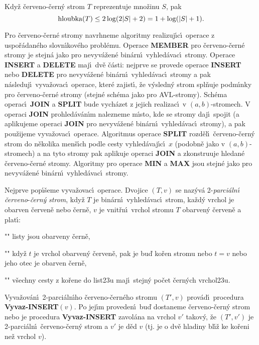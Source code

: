 Kdy\v z \v cerveno-\v cern\'y strom $T$ 
reprezentuje mno\v zinu $S$, pak $$\operatorname{hloubka}(T)\le 2\log(2|S|+2)=1+\log(|S|+1).$$
\endproclaim

\flushpar Pro \v cerveno-\v cern\'e stromy navrhneme algoritmy 
realizuj\'\i c\'\i\ ope\-race z uspo\v r\'adan\'eho slovn\'\i\-ko\-v\'eho probl\'emu.  
Operace {\bf MEMBER} pro \v cerveno-\v cern\'e stromy je stejn\'a jako pro 
nevyv\'a\v zen\'e bin\'arn\'\i\ vyhled\'avac\'\i\ stromy. Operace 
{\bf IN\-SERT} a {\bf DELETE} maj\'\i\ dv\v e \v c\'asti:  nejprve se provede 
ope\-race {\bf INSERT} nebo {\bf DELETE} pro nevyv\'a\v zen\'e bin\'arn\'\i\ 
vy\-hled\'avac\'\i\ stromy a pak n\'asleduj\'\i\ vyva\v zovac\'\i\ operace, kter\'e 
zajist\'\i , \v ze v\'ysledn\'y strom spl\v nuje pod\-m\'\i n\-ky pro \v cerveno-\v cern\'e 
stromy (stejn\'e sch\'ema jako pro AVL-stromy). Sch\'ema operac\'\i\ 
{\bf JOIN} a {\bf SPLIT} bude vych\'azet z jejich realizac\'\i\ v $
(a,b)$-stromech. 
V operaci {\bf JOIN} prohled\'av\'an\'\i m nalezneme m\'\i sto, kde se 
stromy  
daj\'\i\ spojit (a aplikujeme operaci {\bf JOIN} pro 
nevyv\'a\v zen\'e 
bin\'arn\'\i\ vyhled\'a\-va\-c\'\i\ stromy), a pak pou\v zijeme 
vyva\v zovac\'\i\ operace. Algoritmus ope\-race {\bf SPLIT} rozd\v el\'\i\ \v cerveno-\v cern\'y strom 
do n\v ekolika men\v s\'\i ch podle cesty vyhled\'avaj\'\i c\'\i\ $
x$ (podobn\v e jako 
v $(a,b)$-stromech) a na tyto stromy pak aplikuje operaci {\bf JOIN }
a zkonstruuje hledan\'e \v cerveno-\v cern\'e stromy. Algoritmy pro 
ope\-race {\bf MIN} a {\bf MAX} jsou stejn\'e jako pro nevyv\'a\v zen\'e bin\'arn\'\i\ 
vyhled\'avac\'\i\ stromy.
\medskip

\flushpar Nejprve pop\'\i\v seme vyva\v zovac\'\i\ operace. 
Dvojice $(T,v)$ se naz\'yv\'a 2-\emph{parci\'aln\'\i}
\emph{\v cerveno}-\emph{\v cern\'y} \emph{strom}, kdy\v z $T$ je 
bin\'arn\'\i\ vyhled\'avac\'\i\ strom, ka\v zd\'y vrchol je obarven 
\v cerven\v e nebo \v cern\v e, $v$ je 
vnit\v rn\'\i\ vrchol stromu $T$ obarven\'y \v cerven\v e a plat\'\i :
\roster
\item"{}"
listy jsou obarveny \v cern\v e,
\item"{}"
kdy\v z $t$ je vrchol obarven\'y \v cerven\v e, pak je bu\v d ko\v ren 
stromu nebo $t=v$ nebo jeho otec je obarven \v cern\v e,
\item"{}"
v\v sechny cesty z ko\v rene do list\accent23u maj\'\i\ stejn\'y 
po\v cet \v cer\-n\'ych vrchol\accent23u.
\endroster
\medskip

\flushpar Vyva\v zov\'an\'\i\ 2-parci\'aln\'\i ho \v cerveno-\v cern\'eho stromu $(T',v)$ 
pro\-v\'a\-d\'\i\ procedura {\bf Vyvaz-IN\-SERT$(v)$}.  Po jej\'\i m 
proveden\'\i\ bu\v d do\-sta\-neme \v cer\-ve\-no-\v cern\'y strom nebo 
je procedura {\bf Vyvaz-IN\-SERT} zavol\'ana na vrchol $
v'$ takov\'y, 
\v ze $(T',v')$ je 2-parci\'aln\'\i\ \v cerve\-no-\v cern\'y strom a $
v'$ je d\v ed $v$ 
(tj.  je o dv\v e hladiny bl\'\i\v z ke ko\v reni ne\v z vrchol $
v$). 
\medskip

